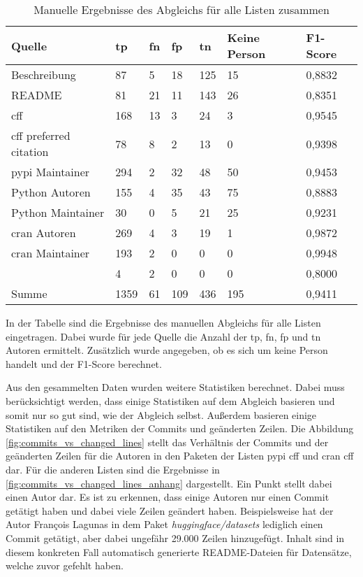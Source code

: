 \begin{table}
    \begin{tabularx}{\textwidth}{XR{.8cm}R{.8cm}R{.8cm}R{.8cm}R{2.8cm}R{2cm}}
        \toprule
        \textbf{Quelle} & \textbf{\gls{tp}} & \textbf{\gls{fn}} & \textbf{\gls{fp}} & \textbf{\gls{tn}} & \textbf{Keine Person} & \textbf{F1-Score} \\ \midrule
        Beschreibung                 & 87   & 5  & 18  & 125 & 15  & 0,8832 \\
        README                       & 81   & 21 & 11  & 143 & 26  & 0,8351 \\
        \gls{cff}                    & 168  & 13 & 3   & 24  & 3   & 0,9545 \\
        \gls{cff} preferred citation & 78   & 8  & 2   & 13  & 0   & 0,9398 \\
        \gls{pypi} Maintainer        & 294  & 2  & 32  & 48  & 50  & 0,9453 \\
        Python Autoren               & 155  & 4  & 35  & 43  & 75  & 0,8883 \\
        Python Maintainer            & 30   & 0  & 5   & 21  & 25  & 0,9231 \\
        \gls{cran} Autoren           & 269  & 4  & 3   & 19  & 1   & 0,9872 \\
        \gls{cran} Maintainer        & 193  & 2  & 0   & 0   & 0   & 0,9948 \\
                      & 4    & 2  & 0   & 0   & 0   & 0,8000 \\ \midrule
        Summe                        & 1359 & 61 & 109 & 436 & 195 & 0,9411 \\
        \bottomrule
    \end{tabularx}
    \caption{Manuelle Ergebnisse des Abgleichs für alle Listen zusammen}
    \label{tab:matching_results_manual}
    \small
    In der Tabelle sind die Ergebnisse des manuellen Abgleichs für alle Listen eingetragen. Dabei wurde für jede Quelle die Anzahl der \gls{tp}, \gls{fn}, \gls{fp} und \gls{tn} Autoren ermittelt. Zusätzlich wurde angegeben, ob es sich um keine Person handelt und der F1-Score berechnet.
\end{table}

Aus den gesammelten Daten wurden weitere Statistiken berechnet.
Dabei muss berücksichtigt werden, dass einige Statistiken auf dem Abgleich basieren und somit nur so gut sind, wie der Abgleich selbst.
Außerdem basieren einige Statistiken auf den Metriken der Commits und geänderten Zeilen.
Die Abbildung \autoref{fig:commits_vs_changed_lines} stellt das Verhältnis der Commits und der geänderten Zeilen für die Autoren in den Paketen der Listen \gls{pypi} \gls{cff} und \gls{cran} \gls{cff} dar.
Für die anderen Listen sind die Ergebnisse in \autoref{fig:commits_vs_changed_lines_anhang} dargestellt.
Ein Punkt stellt dabei einen Autor dar.
Es ist zu erkennen, dass einige Autoren nur einen Commit getätigt haben und dabei viele Zeilen geändert haben.
Beispielsweise hat der Autor François Lagunas in dem Paket \emph{huggingface/datasets} lediglich einen Commit getätigt, aber dabei ungefähr 29.000 Zeilen hinzugefügt.
Inhalt sind in diesem konkreten Fall automatisch generierte README-Dateien für Datensätze, welche zuvor gefehlt haben.

